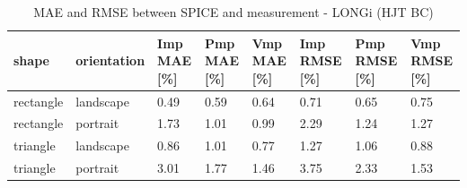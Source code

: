 \begin{table}[htbp]
\centering
\caption{MAE and RMSE between SPICE and measurement - LONGi (HJT BC)}
\label{tab:mae_rmse_longi}
\begin{tabular}{@{}llllllll@{}}
\toprule
shape & orientation & Imp MAE [\%] & Pmp MAE [\%] & Vmp MAE [\%] & Imp RMSE [\%] & Pmp RMSE [\%] & Vmp RMSE [\%] \\
\midrule
rectangle & landscape & 0.49 & 0.59 & 0.64 & 0.71 & 0.65 & 0.75 \\
rectangle & portrait & 1.73 & 1.01 & 0.99 & 2.29 & 1.24 & 1.27 \\
triangle & landscape & 0.86 & 1.01 & 0.77 & 1.27 & 1.06 & 0.88 \\
triangle & portrait & 3.01 & 1.77 & 1.46 & 3.75 & 2.33 & 1.53 \\
\bottomrule
\end{tabular}
\end{table}
